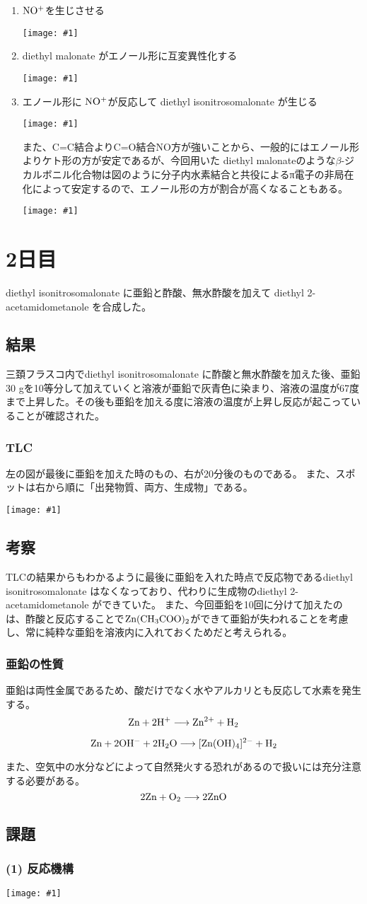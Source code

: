 \documentclass[a4paper,papersize,dvipdfmx]{jsarticle}
\newcommand{\pic}[1]{\begin{center} \texttt{[image: \#1]} \end{center}}   %
\newcommand{\pict}[2]{\begin{center} \texttt{[image: \#1]} \end{center}}   %
\begin{document}
\begin{enumerate}
\item $\rm NO^+$を生じさせる
\pict{imgs1/hk1.jpeg}{10}
\item diethyl malonate がエノール形に互変異性化する
\pict{imgs1/hk2.jpeg}{12}
\item エノール形に $\rm NO^+$が反応して diethyl isonitrosomalonate が生じる
\pict{imgs1/hk3.jpeg}{12}

また、C=C結合よりC=O結合NO方が強いことから、一般的にはエノール形よりケト形の方が安定であるが、今回用いた diethyl malonateのような$\beta$-ジカルボニル化合物は図のように分子内水素結合と共役によるπ電子の非局在化によって安定するので、エノール形の方が割合が高くなることもある。
\pict{imgs1/bck.jpeg}{7}
\end{enumerate}


\section*{2日目}
diethyl isonitrosomalonate に亜鉛と酢酸、無水酢酸を加えて diethyl 2-acetamidometanole を合成した。

\subsection*{結果}
三頚フラスコ内でdiethyl isonitrosomalonate に酢酸と無水酢酸を加えた後、亜鉛30 gを10等分して加えていくと溶液が亜鉛で灰青色に染まり、溶液の温度が67度まで上昇した。その後も亜鉛を加える度に溶液の温度が上昇し反応が起こっていることが確認された。

\subsubsection*{TLC}
左の図が最後に亜鉛を加えた時のもの、右が20分後のものである。
また、スポットは右から順に「出発物質、両方、生成物」である。
\pict{imgs2/tlc.jpeg}{7.5}

\subsection*{考察}
TLCの結果からもわかるように最後に亜鉛を入れた時点で反応物であるdiethyl isonitrosomalonate はなくなっており、代わりに生成物のdiethyl 2-acetamidometanole ができていた。
また、今回亜鉛を10回に分けて加えたのは、酢酸と反応することで$\rm Zn(CH_3COO)_2$ができて亜鉛が失われることを考慮し、常に純粋な亜鉛を溶液内に入れておくためだと考えられる。

\subsubsection*{亜鉛の性質}
亜鉛は両性金属であるため、酸だけでなく水やアルカリとも反応して水素を発生する。
\[\rm Zn + 2 H^+ \longrightarrow Zn^{2+} + H_2\]

\[\rm Zn + 2OH^-+ 2H_2O \longrightarrow [Zn(OH)_4]^{2-} + H_2\]

また、空気中の水分などによって自然発火する恐れがあるので扱いには充分注意する必要がある。
\[ \rm 2 Zn + O_2 \longrightarrow 2ZnO\]

\subsection*{課題}

\subsubsection*{(1) 反応機構}
\pic{imgs2/hk.jpg}
\end{document}

